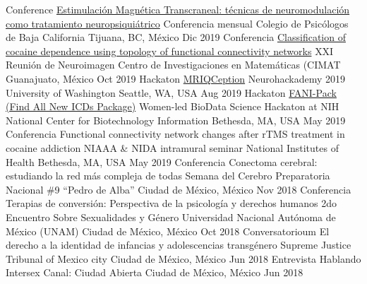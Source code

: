 \begin{cvproceedings}
    \cvproceeding
        {Conference}
        {\href{https://soffiafdz.github.io/slides/EMTr.html}{Estimulación Magnética Transcraneal: técnicas de neuromodulación como tratamiento neuropsiquiátrico}}
        {Conferencia mensual}
        {Colegio de Psicólogos de Baja California}
        {Tijuana, BC, México}
        {Dic 2019}
    \cvproceeding
        {Conferencia}
        {\href{https://soffiafdz.github.io/slides/neuroimagenXXI.html}{Classification of cocaine dependence using topology of functional connectivity networks}}
        {XXI Reunión de Neuroimagen}
        {Centro de Investigaciones en Matemáticas (CIMAT}
        {Guanajuato, México}
        {Oct 2019}
    \cvproceeding
        {Hackaton}
        {\href{https://github.com/elizabethbeard/mriqception}{MRIQCeption}}
        {Neurohackademy 2019}
        {University of Washington}
        {Seattle, WA, USA}
        {Aug 2019}
    \cvproceeding
        {Hackaton}
        {\href{https://github.com/NCBI-Hackathons/Design-of-ICD-9-to-10-conversion-function-for-the-R-package-icd}{FANI-Pack (Find All New ICDs Package)}}
        {Women-led BioData Science Hackaton at NIH}
        {National Center for Biotechnology Information}
        {Bethesda, MA, USA}
        {May 2019}
    \cvproceeding
        {Conferencia}
        {Functional connectivity network changes after rTMS treatment in cocaine addiction}
        {NIAAA \& NIDA intramural seminar}
        {National Institutes of Health}
        {Bethesda, MA, USA}
        {May 2019}
    \cvproceeding
        {Conferencia}
        {Conectoma cerebral: estudiando la red más compleja de todas}
        {Semana del Cerebro}
        {Preparatoria Nacional \#9 ``Pedro de Alba''}
        {Ciudad de México, México}
        {Nov 2018}
    \cvproceeding
        {Conferencia}
        {Terapias de conversión: Perspectiva de la psicología y derechos humanos}
        {2do Encuentro Sobre Sexualidades y Género}
        {Universidad Nacional Autónoma de México (UNAM)}
        {Ciudad de México, México}
        {Oct 2018}
    \cvproceeding
        {Conversatorioum}
        {El derecho a la identidad de infancias y adolescencias transgénero}
        {}
        {Supreme Justice Tribunal of Mexico city}
        {Ciudad de México, México}
        {Jun 2018}
    \cvproceeding
        {Entrevista}
        {Hablando Intersex}
        {}
        {Canal: Ciudad Abierta}
        {Ciudad de México, México}
        {Jun 2018}
\end{cvproceedings}
